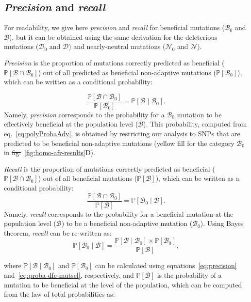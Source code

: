 \documentclass[10pt,letterpaper]{article}
\newcommand{\proba}{\mathbb{P}}
\newcommand{\SphyDel}{\mathcal{D}_0}
\newcommand{\SphyNeu}{\mathcal{N}_0}
\newcommand{\SphyBen}{\mathcal{B}_0}
\newcommand{\given}{\mid}
\newcommand{\SpopDel}{\mathcal{D}}
\newcommand{\SpopNeu}{\mathcal{N}}
\newcommand{\SpopBen}{\mathcal{B}}
\newcommand{\ProbaPopBen}{\proba [ \SpopBen ]}
\providecommand{\DIFaddtex}[1]{{\protect\color{blue}\uwave{#1}}} %
\providecommand{\DIFdeltex}[1]{{\protect\color{red}\sout{#1}}}                      %
\providecommand{\DIFaddbegin}{} %
\providecommand{\DIFaddend}{} %
\providecommand{\DIFdelbegin}{} %
\providecommand{\DIFdelend}{} %
\providecommand{\DIFadd}[1]{\texorpdfstring{\DIFaddtex{#1}}{#1}} %
\providecommand{\DIFdel}[1]{\texorpdfstring{\DIFdeltex{#1}}{}} %
\newcommand{\DIFscaledelfig}{0.5}
\newlength{\DIFdelgraphicswidth} %
\newlength{\DIFdelgraphicsheight} %
\newcommand{\DIFaddincludegraphics}[2][]{{\color{blue}\fbox{\DIFOincludegraphics[#1]{#2}}}} %
\newcommand{\DIFdelincludegraphics}[2][]{%
\sbox{\DIFdelgraphicsbox}{\DIFOincludegraphics[#1]{#2}}%
\settoboxwidth{\DIFdelgraphicswidth}{\DIFdelgraphicsbox} %
\settoboxtotalheight{\DIFdelgraphicsheight}{\DIFdelgraphicsbox} %
\scalebox{\DIFscaledelfig}{%
\parbox[b]{\DIFdelgraphicswidth}{\usebox{\DIFdelgraphicsbox}\\[-\baselineskip] \rule{\DIFdelgraphicswidth}{0em}}\llap{\resizebox{\DIFdelgraphicswidth}{\DIFdelgraphicsheight}{%
\setlength{\unitlength}{\DIFdelgraphicswidth}%
\begin{picture}(1,1)%
\thicklines\linethickness{2pt} %
{\color[rgb]{1,0,0}\put(0,0){\framebox(1,1){}}}%
{\color[rgb]{1,0,0}\put(0,0){\line( 1,1){1}}}%
{\color[rgb]{1,0,0}\put(0,1){\line(1,-1){1}}}%
\end{picture}%
}\hspace*{3pt}}} %
} %
\DeclareRobustCommand{\DIFaddbegin}{\DIFOaddbegin \let\includegraphics\DIFaddincludegraphics} %
\DeclareRobustCommand{\DIFaddend}{\DIFOaddend \let\includegraphics\DIFOincludegraphics} %
\DeclareRobustCommand{\DIFdelbegin}{\DIFOdelbegin \let\includegraphics\DIFdelincludegraphics} %
\DeclareRobustCommand{\DIFdelend}{\DIFOaddend \let\includegraphics\DIFOincludegraphics} %
\begin{document}
\subsection{\textit{Precision} and \textit{recall}}
\label{subsec:precisison_recall}
For readability, we give here \textit{precision} and \textit{recall} for beneficial mutations ($\SphyBen$ and $\SpopBen$), but it can be obtained using the same derivation for the deleterious mutations ($\SphyDel$ and $\SpopDel$) and nearly-neutral mutations ($\SphyNeu$ and $\SpopNeu$).

\textit{Precision} is the proportion of mutations correctly predicted as beneficial ($\proba [ \SpopBen \cap  \SphyBen]$) out of all predicted as beneficial non-adaptive mutations ($\proba [ \SphyBen]$), which can be written as a conditional probability:

\begin{equation}
\frac{\proba [ \SpopBen  \cap  \SphyBen]}{\proba [ \SphyBen]} = \proba [ \SpopBen \given \SphyBen].
\label{eq:precision}
\end{equation}
Namely, \textit{precision} corresponds to the probability for a $\SphyBen$ mutation to be effectively beneficial at the population level ($\SpopBen$).
This probability, computed from eq.~\ref{eq:polyProbaAdv}, is obtained by restricting our analysis to SNPs that are predicted to be beneficial non-adaptive mutations (yellow fill for the category $\SphyBen$ in \DIFdelbegin \DIFdel{fig.}\DIFdelend \DIFaddbegin \DIFadd{Fig}\DIFaddend ~\ref{fig:homo-afr-results}D).

\textit{Recall} is the proportion of mutations correctly predicted as beneficial ($\proba [ \SpopBen \cap  \SphyBen]$) out of all beneficial mutations ($\proba [ \SpopBen]$), which can be written as a conditional probability:
\begin{equation}
\frac{\proba [ \SpopBen \cap  \SphyBen]}{\proba [ \SpopBen]} = \proba [ \SphyBen  \given \SpopBen ].
\end{equation}
Namely, \textit{recall} corresponds to the probability for a beneficial mutation at the population level ($\SpopBen$) to be a beneficial non-adaptive mutation ($\SphyBen$).
Using Bayes theorem, \textit{recall} can be re-written as:
\begin{equation}
\proba [\SphyBen \given \SpopBen] = \frac{\proba [\SpopBen \given \SphyBen] \times \proba[\SphyBen]}{\ProbaPopBen},
\label{eq:bayes}
\end{equation}

where $\proba [\SpopBen \given \SphyBen]$ and $\proba [ \SphyBen ]$ can be calculated using equations~\ref{eq:precision} and~\ref{eq:proba-dfe-mutsel}, respectively, and $\proba [ \SpopBen ]$ is the probability of a mutation to be beneficial at the level of the population, which can be computed from the law of total probabilities as:
\end{document}
